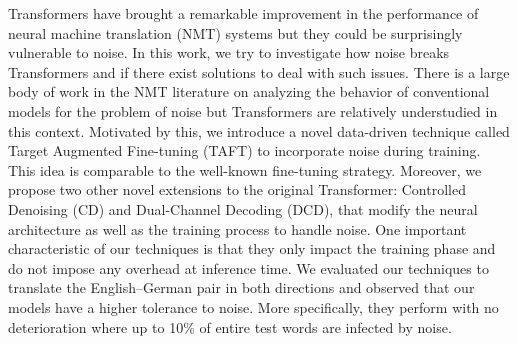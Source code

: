 Transformers have brought a remarkable improvement in the performance of neural machine translation (NMT) systems but they could be surprisingly vulnerable to noise. In this work, we try to investigate how noise breaks Transformers and if there exist solutions to deal with such issues. There is a large body of work in the NMT literature on analyzing the behavior of conventional models for the problem of noise but Transformers are relatively understudied in this context. Motivated by this, we introduce a novel data-driven technique called Target Augmented Fine-tuning (TAFT) to incorporate noise during training. This idea is comparable to the well-known fine-tuning strategy. Moreover, we propose two other novel extensions to the original Transformer: Controlled Denoising (CD) and Dual-Channel Decoding (DCD), that modify the neural architecture as well as the training process to handle noise. One important characteristic of our techniques is that they only impact the training phase and do not impose any overhead at inference time. We evaluated our techniques to translate the English--German pair in both directions and observed that our models have a higher tolerance to noise. More specifically, they perform with no deterioration where up to 10\% of entire test words are infected by noise.
